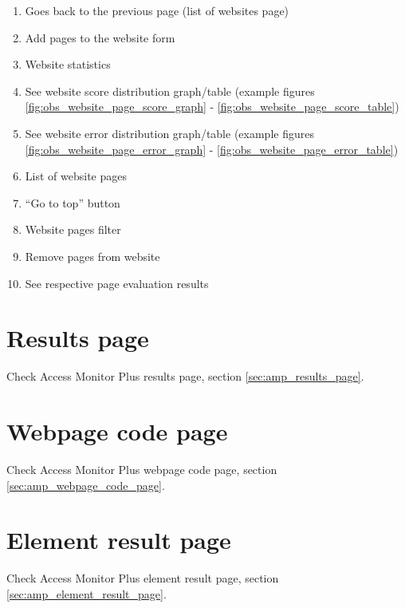 \begin{enumerate}
    \item Goes back to the previous page (list of websites page)
    \item Add pages to the website form
    \item Website statistics
    \item See website score distribution graph/table (example figures \ref{fig:obs_website_page_score_graph} - \ref{fig:obs_website_page_score_table})
    \item See website error distribution graph/table (example figures \ref{fig:obs_website_page_error_graph} - \ref{fig:obs_website_page_error_table})
    \item List of website pages
    \item ``Go to top'' button
    \item Website pages filter
    \item Remove pages from website
    \item See respective page evaluation results
\end{enumerate}

\section{Results page}

Check Access Monitor Plus results page, section \ref{sec:amp_results_page}.

\section{Webpage code page}

Check Access Monitor Plus webpage code page, section \ref{sec:amp_webpage_code_page}.

\section{Element result page}

Check Access Monitor Plus element result page, section \ref{sec:amp_element_result_page}.